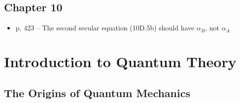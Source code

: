\documentclass[12pt, openany, letterpaper]{memoir}
\begin{document}
\section*{Chapter 10}
\begin{itemize}
	\item p. 423 -- The second secular equation (10D.5b) should have $\alpha_B$, not $\alpha_A$
\end{itemize}


\setcounter{chapter}{6}
\chapter{Introduction to Quantum Theory}
\section{The Origins of Quantum Mechanics}
\end{document}
